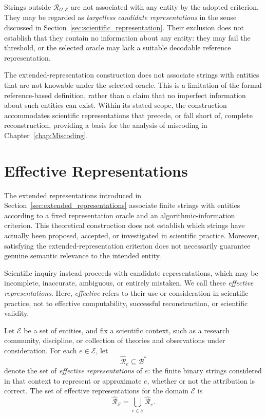 Strings outside $\mathcal R_{\mathcal O,\mathcal E}$ are not associated with any entity by the adopted criterion. They may be regarded as \emph{targetless candidate representations} in the sense discussed in Section~\ref{sec:scientific_representation}. Their exclusion does not establish that they contain no information about any entity: they may fail the threshold, or the selected oracle may lack a suitable decodable reference representation.

The extended-representation construction does not associate strings with entities that are not knowable under the selected oracle. This is a limitation of the formal reference-based definition, rather than a claim that no imperfect information about such entities can exist. Within its stated scope, the construction accommodates scientific representations that precede, or fall short of, complete reconstruction, providing a basis for the analysis of miscoding in Chapter~\ref{chap:Miscoding}.

%
%


\section{Effective Representations}
\label{sec:effective_representations}

The extended representations introduced in Section~\ref{sec:extended_representations} associate finite strings with entities according to a fixed representation oracle and an algorithmic-information criterion. This theoretical construction does not establish which strings have actually been proposed, accepted, or investigated in scientific practice. Moreover, satisfying the extended-representation criterion does not necessarily guarantee genuine semantic relevance to the intended entity.

Scientific inquiry instead proceeds with candidate representations, which may be incomplete, inaccurate, ambiguous, or entirely mistaken. We call these \emph{effective representations}. Here, \emph{effective} refers to their use or consideration in scientific practice, not to effective computability, successful reconstruction, or scientific validity.

\begin{definition}
\label{def:effective_representations}
Let $\mathcal E$ be a set of entities, and fix a scientific context, such as a research community, discipline, or collection of theories and observations under consideration. For each $e\in\mathcal E$, let
\[
\hat{\mathcal R}_e\subseteq\mathcal B^\ast
\]
denote the set of \emph{effective representations} of $e$: the finite binary strings considered in that context to represent or approximate $e$, whether or not the attribution is correct. The set of effective representations for the domain $\mathcal E$ is
\[
\hat{\mathcal R}_{\mathcal E}
=\bigcup_{e\in\mathcal E}\hat{\mathcal R}_e.
\]
\end{definition}

